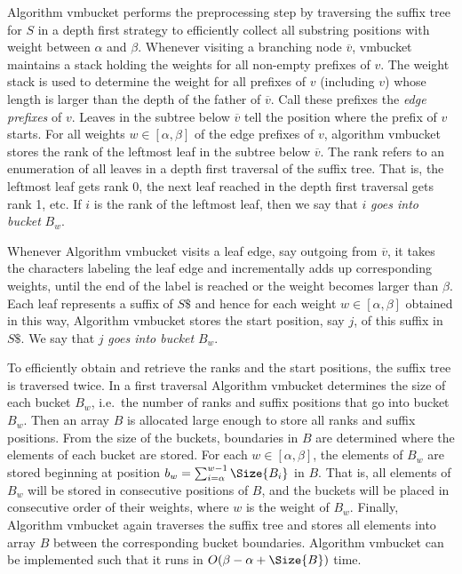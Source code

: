 \documentclass[12pt]{article}
\newcommand{\Vmbucket}[0]{{\small \textsf{vmbucket}}\xspace}
\newcommand{\Weight}[0]{w}
\begin{document}
Algorithm \Vmbucket performs the preprocessing step by 
traversing the suffix tree for \(S\)
in a depth first strategy to efficiently collect all substring positions with 
weight between \(\alpha\) and 
\(\beta\). Whenever visiting a branching node \(\overline{v}\),
\Vmbucket maintains a stack holding the weights for all non-empty prefixes
of \(v\). The weight stack is used to determine the weight for all prefixes 
of \(v\) (including \(v\)) whose length is larger than the depth of the 
father of \(\overline{v}\). Call these prefixes the \emph{edge prefixes}
of \(v\). Leaves in the subtree below \(\overline{v}\) tell the position where 
the prefix of \(v\) starts. For all weights \(\Weight\in[\alpha,\beta]\) 
of the edge prefixes of \(v\), algorithm \Vmbucket stores the rank of the 
leftmost leaf in the subtree below \(\overline{v}\). The rank refers to an
enumeration of all leaves in a depth first traversal of the suffix tree. That
is, the leftmost leaf gets rank 0, the next leaf reached in the depth
first traversal gets rank 1, etc. If \(i\) is the rank of the leftmost leaf,
then we say that \(i\) \emph{goes into bucket} \(B_{\Weight}\).

Whenever Algorithm \Vmbucket visits a leaf edge, say outgoing from 
\(\overline{v}\), it takes the characters labeling the leaf edge and
incrementally adds up corresponding weights, until the end of
the label is reached or the weight becomes larger than \(\beta\). 
Each leaf represents a suffix of \(S\$\) and hence for each weight 
\(\Weight\in[\alpha,\beta]\) obtained in this way, Algorithm \Vmbucket stores 
the start position, say \(j\), of this suffix in \(S\$\). We say that \(j\)
\emph{goes into bucket} \(B_{\Weight}\).

To efficiently obtain and retrieve the ranks and the start positions,
the suffix tree is traversed twice. In a first traversal Algorithm
\Vmbucket determines the size of each bucket \(B_{\Weight}\), i.e.\ the number 
of ranks and suffix positions that go into bucket \(B_{\Weight}\). Then an array
\(B\) is allocated large enough to store all ranks and suffix positions. 
From the size of the buckets, boundaries in \(B\) are determined where 
the elements of each bucket are stored. For each \(\Weight\in[\alpha,\beta]\), 
the elements of \(B_{\Weight}\) are stored beginning at position 
\(b_{\Weight}=\sum_{i=\alpha}^{\Weight-1}\Size{B_{i}}\) in \(B\). That is, all 
elements of \(B_{\Weight}\) will be stored in consecutive positions of \(B\),
and the buckets will be placed in consecutive order of their weights, where
\(\Weight\) is the weight of \(B_{\Weight}\). Finally, Algorithm \Vmbucket 
again traverses the suffix tree and stores all elements into array \(B\) 
between the corresponding bucket boundaries. 
Algorithm \Vmbucket can be implemented such 
that it runs in \(O(\beta-\alpha+\Size{B})\) time.
\end{document}
